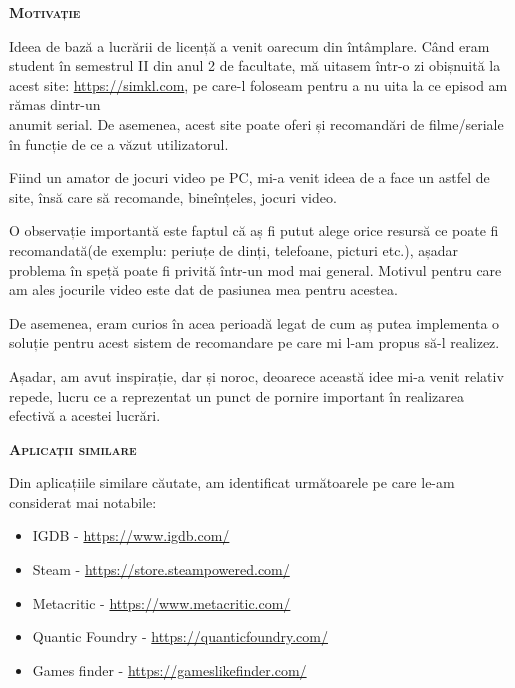 \documentclass[12pt,a4paper]{report}
\begin{document}
	\bigskip

	{\scshape\normalsize \textbf{Motivație} \par}
	
	\bigskip

	Ideea de bază a lucrării de licență a venit oarecum din întâmplare. Când eram student în semestrul II din anul 2 de facultate, mă uitasem într-o zi obișnuită la acest site: \href{https://simkl.com/}{https://simkl.com}, pe care-l foloseam pentru a nu uita la ce episod am rămas dintr-un\\ anumit serial. De asemenea, acest site poate oferi și recomandări de filme/seriale în funcție de ce a văzut utilizatorul.
	
	Fiind un amator de jocuri video pe PC, mi-a venit ideea de a face un astfel de site, însă care să recomande, bineînțeles, jocuri video.
	
	O observație importantă este faptul că aș fi putut alege orice resursă ce poate fi recomandată(de exemplu: periuțe de dinți, telefoane, picturi etc.), așadar problema în speță poate fi privită într-un mod mai general. Motivul pentru care am ales jocurile video este dat de pasiunea mea pentru acestea.
	
	De asemenea, eram curios în acea perioadă legat de cum aș putea implementa o soluție pentru acest sistem de recomandare pe care mi l-am propus să-l realizez.
	
	Așadar, am avut inspirație, dar și noroc, deoarece această idee mi-a venit relativ repede, lucru ce a reprezentat un punct de pornire important în realizarea efectivă a acestei lucrări.
	
	\newpage
	

	{\scshape\normalsize \textbf{Aplicații similare} \par}
	
	\bigskip
	
	Din aplicațiile similare căutate, am identificat următoarele pe care le-am considerat mai notabile:
	
\begin{itemize}
  \item IGDB - \url{https://www.igdb.com/}
  \item Steam - \url{https://store.steampowered.com/}
  \item Metacritic - \url{https://www.metacritic.com/}
  \item Quantic Foundry - \url{https://quanticfoundry.com/}
  \item Games finder - \url{https://gameslikefinder.com/}
\end{itemize}
\end{document}
